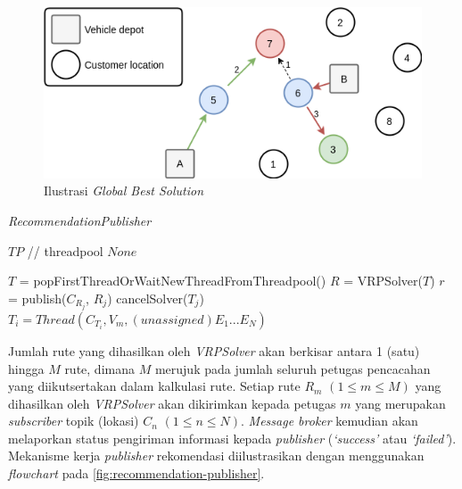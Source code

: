 \begin{figure}[!]
	\centering
	\includegraphics[width=12cm]{Resources/Images/global-best-greedy-solution}
	\caption{Ilustrasi \textit{Global Best Solution}}
	\label{fig:global-best-greedy-solution}
\end{figure}


\begin{algorithm}[!]
	\caption{\textit{RecommendationPublisher}}
	\label{alg:vrp-worker}
	\begin{algorithmic}[1]
		\renewcommand{\algorithmicrequire}{\textbf{Input:}}
		\renewcommand{\algorithmicensure}{\textbf{Output:}}
		\REQUIRE $TP$		// threadpool
		\ENSURE  $None$
		
		\STATE $T$ = popFirstThreadOrWaitNewThreadFromThreadpool()
		\STATE $R$ = VRPSolver($T$)
		\STATE $r$ = publish($C_{R_j}$, $R_j$)
		\STATE cancelSolver($T_j$)
		\STATE $T_i = Thread(C_{T_i}, V_m, (unassigned) E_1...E_N)$
		\ENDIF
		\ENDFOR
		\ENDWHILE	
	\end{algorithmic}
\end{algorithm}


Jumlah rute yang dihasilkan oleh \textit{VRPSolver} akan berkisar antara 1 (satu) hingga $M$ rute, dimana $M$ merujuk pada jumlah seluruh petugas pencacahan yang diikutsertakan dalam kalkulasi rute. Setiap rute $R_m$ $(1 \leq m \leq M)$ yang dihasilkan oleh \textit{VRPSolver} akan dikirimkan kepada petugas $m$ yang merupakan \textit{subscriber} topik (lokasi) $C_n$ $(1 \leq n \leq N)$. \textit{Message broker} kemudian akan melaporkan status pengiriman informasi kepada \textit{publisher} (\textit{`success'} atau \textit{`failed'}). Mekanisme kerja \textit{publisher} rekomendasi diilustrasikan dengan menggunakan \textit{flowchart} pada \autoref{fig:recommendation-publisher}.


